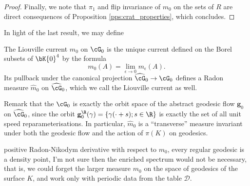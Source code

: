 \documentclass[reqno,11pt]{amsart}
\begin{document}
\begin{proof}
        Finally, we note that \(\pi_1\) and flip invariance of \(m_0\) on the sets of \(R\) are direct consequences of Proposition \ref{pps:crat_properties}, which concludes.
    \end{proof}
    In light of the last result, we may define
    \begin{defi}
        The Liouville current \(m_0\) on \(\cG_0\) is the unique current defined on the Borel subsets of \(\bK{0}^4\) by the formula
        \[
            m_0(A) = \lim_{\epsilon \to 0}m_\epsilon(A).
        \] 
        Its pullback under the canonical projection \(\widehat{\cG}_0 \to \cG_0\) defines a Radon measure \(\widehat{m}_0\) on \(\widehat{\cG}_0\), which we call the Liouville current as well.
    \end{defi}
    Remark that the \(\cG_0\) is exactly the orbit space of the abstract geodesic flow \(\mathbf{g}_0\) on  \(\widehat{\cG}_0\), since the orbit \(\mathbf{g}^\R_0(\gamma) = \{\gamma( \cdot + s); s \in \R\}\) is exactly the set of all unit speed reparameterisations. 
    In particular, \(\widehat{m}_0\) is a ``transverse'' measure invariant under both the geodesic flow and the action of \(\pi(K)\) on geodesics.
    
\textemdash positive Radon-Nikodym derivative with respect to \(m_0\), every regular geodesic is a density point, I'm not sure \textemdash then the enriched spectrum would not be necessary, that is, we could forget the larger measure \(m_0\) on the space of geodesics of the surface \(K\), and work only with periodic data from the table \(\mathcal{D}\).

    
      
\end{document}
